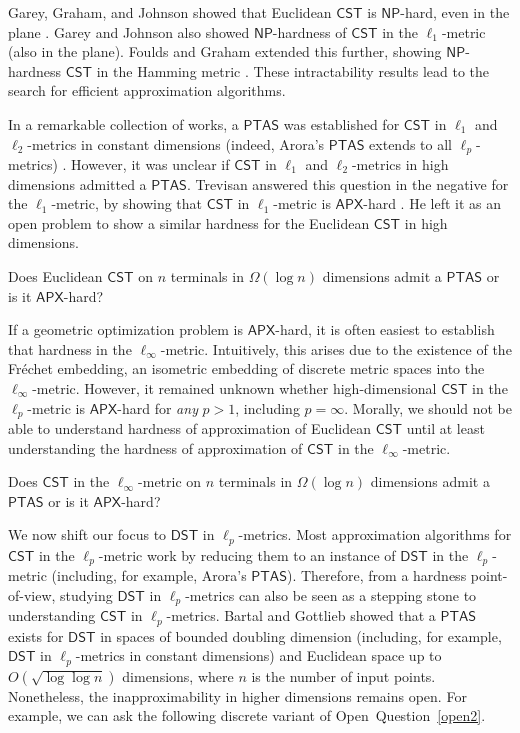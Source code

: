\documentclass{article}\providecommand{\DeclareRedundantLanguages}[2]{}\usepackage[a4paper,margin=20mm]{geometry}
\newcommand{\1}{\textbf{1}}
\newcommand{\cst}{$\mathsf{CST}$\xspace}
\newcommand{\dst}{$\mathsf{DST}$\xspace}
\newcommand{\np}{$\mathsf{NP}$\xspace}
\newcommand{\apx}{$\mathsf{APX}$\xspace}
\newcommand{\ptas}{$\mathsf{PTAS}$\xspace}
\begin{document}
Garey, Graham, and Johnson showed that Euclidean \cst is \np-hard, even in the plane \cite{Garey_Graham_Johnson_1977}.  Garey and Johnson also showed \np-hardness of \cst in the $\ell_1$-metric \cite{Garey_Johnson_1977} (also in the plane). Foulds and Graham extended this further, showing \np-hardness \cst in the Hamming metric \cite{foulds1982steiner}. These intractability results lead to the search for efficient approximation algorithms. 

In a remarkable collection of works, a \ptas was established for \cst in $\ell_1$ and $\ell_2$-metrics in constant dimensions (indeed, Arora's \ptas extends to all $\ell_p$-metrics) \cite{Arora_1998,Mitchell99,RaoS98}. However, it was unclear  if  \cst in $\ell_1$ and $\ell_2$-metrics in high dimensions admitted a \ptas. Trevisan \cite{Trevisan00} answered this question in the negative for the $\ell_1$-metric, by showing that \cst in $\ell_1$-metric is \apx-hard \cite{Chakrabarty_Devanur_Vazirani_2011,Hanan_1966,Day_Johnson_Sankoff_1986,Wareham_1995}. He left it as an open problem to show a similar hardness for the Euclidean \cst in high dimensions. 
 

\begin{openq}\label{open2}
Does Euclidean \cst on $n$ terminals in $\Omega(\log n)$ dimensions admit a \ptas or is it \apx-hard?
\end{openq}

If a geometric optimization problem is \apx-hard, it is often easiest to establish that hardness in the $\ell_{\infty}$-metric. Intuitively, this arises due to the existence of the Fr\'{e}chet embedding, an isometric embedding of discrete metric spaces into the $\ell_{\infty}$-metric. However, it remained unknown whether high-dimensional \cst in the $\ell_p$-metric is \apx-hard  for \textit{any} $p > 1$, including $p = \infty$. Morally, we should not be able to understand hardness of approximation of Euclidean \cst until at least understanding the hardness of approximation of \cst in the $\ell_{\infty}$-metric.
 
 \begin{openq}\label{open3}
Does \cst in the $\ell_{\infty}$-metric on $n$ terminals in $\Omega(\log n)$ dimensions admit a \ptas or is it \apx-hard?
\end{openq}



We now shift our focus to \dst in $\ell_p$-metrics. Most approximation algorithms for \cst in the $\ell_p$-metric work by reducing them to an instance of \dst in the $\ell_p$-metric (including, for example, Arora's \ptas \cite{Arora_1998}). Therefore, from a hardness point-of-view, studying \dst in $\ell_p$-metrics can also be seen as a stepping stone to understanding \cst in $\ell_p$-metrics. Bartal and Gottlieb \cite{Bartal_Gottlieb_2021} showed that a \ptas exists for \dst in spaces of bounded doubling dimension (including, for example, \dst in $\ell_p$-metrics in constant dimensions) and Euclidean space up to $O(\sqrt{\log \log n})$ dimensions, where $n$ is the number of input points. Nonetheless, the inapproximability in higher dimensions remains open. For example, we can ask the following discrete variant of Open~Question~\ref{open2}.
\end{document}
